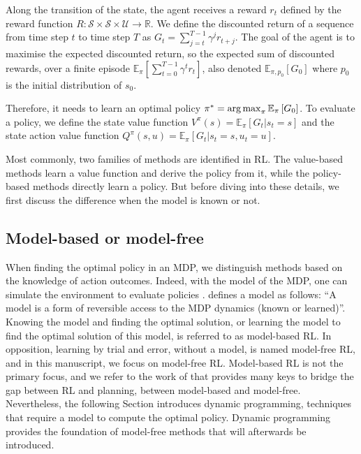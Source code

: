 Along the transition of the state, the agent receives a reward $r_t$ defined by the reward function $R:\mathcal{S} \times \mathcal{S} \times \mathcal{U} \rightarrow \mathbb{R}$.
We define the discounted return of a sequence from time step $t$ to time step $T$ as $G_t= \sum_{j=t}^{T-1} \gamma^j r_{t+j}$.
The goal of the agent is to maximise the expected discounted return, so the expected sum of discounted rewards, over a finite episode $\mathbb{E}_{\pi} \left[\sum_{t=0}^{T-1} \gamma^t r_t \right]$, also denoted $\mathbb{E}_{\pi, p_0}\left[ G_0 \right]$ where $p_0$ is the initial distribution of $s_0$.

Therefore, it needs to learn an optimal policy $\pi^*=\operatorname*{arg\,max}_\pi \mathbb{E}_{\pi}\left[ G_0 \right]$.
To evaluate a policy, we define the state value function $V^\pi(s) = \mathbb{E}_{\pi}\left[G_t|s_t=s\right]$ and the state action value function $Q^\pi(s, u) = \mathbb{E}_{\pi}\left[G_t|s_t=s, u_t=u\right]$.

Most commonly, two families of methods are identified in RL.
The value-based methods learn a value function and derive the policy from it, while the policy-based methods directly learn a policy.
But before diving into these details, we first discuss the difference when the model is known or not.


\subsection{Model-based or model-free}
\label{sec:ch2_model_based_vs_model_free}

When finding the optimal policy in an MDP, we distinguish methods based on the knowledge of action outcomes.
Indeed, with the model of the MDP, one can simulate the environment to evaluate policies \citep{sutton2018reinforcement}.
\cite{moerland2023model} defines a model as follows: ``A model is a form of reversible access to the MDP dynamics (known or learned)''.
Knowing the model and finding the optimal solution, or learning the model to find the optimal solution of this model, is referred to as model-based RL.
In opposition, learning by trial and error, without a model, is named model-free RL, and in this manuscript, we focus on model-free RL.
Model-based RL is not the primary focus, and we refer to the work of \cite{moerland2023model} that provides many keys to bridge the gap between RL and planning, between model-based and model-free.
Nevertheless, the following Section introduces dynamic programming, techniques that require a model to compute the optimal policy.
Dynamic programming provides the foundation of model-free methods that will afterwards be introduced.


